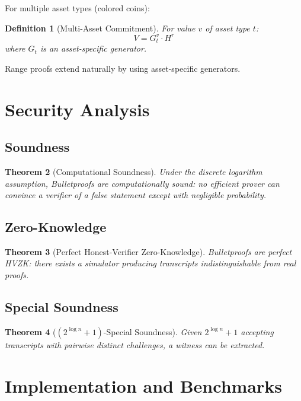 \documentclass[11pt,a4paper]{article}
\newtheorem{theorem}{Theorem}[section]
\newtheorem{definition}[theorem]{Definition}
\begin{document}
For multiple asset types (colored coins):

\begin{definition}[Multi-Asset Commitment]
For value $v$ of asset type $t$:
\[
V = G_t^v \cdot H^r
\]
where $G_t$ is an asset-specific generator.
\end{definition}

Range proofs extend naturally by using asset-specific generators.

\section{Security Analysis}

\subsection{Soundness}

\begin{theorem}[Computational Soundness]
Under the discrete logarithm assumption, Bulletproofs are computationally sound: no efficient prover can convince a verifier of a false statement except with negligible probability.
\end{theorem}

\subsection{Zero-Knowledge}

\begin{theorem}[Perfect Honest-Verifier Zero-Knowledge]
Bulletproofs are perfect HVZK: there exists a simulator producing transcripts indistinguishable from real proofs.
\end{theorem}

\subsection{Special Soundness}

\begin{theorem}[$(2^{\log n} + 1)$-Special Soundness]
Given $2^{\log n} + 1$ accepting transcripts with pairwise distinct challenges, a witness can be extracted.
\end{theorem}

\section{Implementation and Benchmarks}
\label{sec:implementation}
\end{document}

